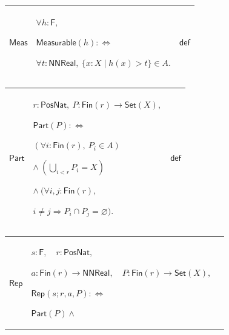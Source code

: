 \documentclass[11pt]{amsart}
\newlength{\FTCThreeColumnBody}
\begin{document}
{\noindent
\begin{tabular}{|@{}>{\centering\arraybackslash}m{0.251968\FTCThreeColumnBody}|>{\centering\arraybackslash}m{0.590551\FTCThreeColumnBody}|>{\centering\arraybackslash}m{0.157480\FTCThreeColumnBody}|}\hline
\hypertarget{def:Meas}{$\displaystyle \textsf{Meas}$} & $\displaystyle \forall h:\textsf{F},$\par
$\displaystyle \textsf{Measurable}(h):\Longleftrightarrow$\par
$\displaystyle \forall t:\textsf{NNReal},\ \{x:X\mid h(x)>t\}\in A.$ & $\displaystyle \textsf{def}$\\ \hline
\end{tabular}%
\par\setlength{\parskip}{0pt}\nointerlineskip
\noindent
\begin{tabular}{|@{}>{\centering\arraybackslash}m{0.251968\FTCThreeColumnBody}|>{\centering\arraybackslash}m{0.590551\FTCThreeColumnBody}|>{\centering\arraybackslash}m{0.157480\FTCThreeColumnBody}|}\hline
\hypertarget{def:Part}{$\displaystyle \textsf{Part}$} & $\displaystyle r:\textsf{PosNat},\ P:\textsf{Fin}(r)\to\textsf{Set}(X),$\par
$\displaystyle \textsf{Part}(P):\Longleftrightarrow$\par
$\displaystyle (\forall i:\textsf{Fin}(r),\ P_i\in A)$\par
$\displaystyle \land\ (\bigcup_{i<r}P_i=X)$\par
$\displaystyle \land\ (\forall i,j:\textsf{Fin}(r),$\par
$\displaystyle i\ne j\Rightarrow P_i\cap P_j=\varnothing).$ & $\displaystyle \textsf{def}$\\ \hline
\end{tabular}%
\par\setlength{\parskip}{0pt}\nointerlineskip
\noindent
\begin{tabular}{|@{}>{\centering\arraybackslash}m{0.251968\FTCThreeColumnBody}|>{\centering\arraybackslash}m{0.590551\FTCThreeColumnBody}|>{\centering\arraybackslash}m{0.157480\FTCThreeColumnBody}|}\hline
\hypertarget{def:Rep}{$\displaystyle \textsf{Rep}$} & $\displaystyle s:\textsf{F},\quad r:\textsf{PosNat},$\par
$\displaystyle a:\textsf{Fin}(r)\to\textsf{NNReal},\quad P:\textsf{Fin}(r)\to\textsf{Set}(X),$\par
$\displaystyle \textsf{Rep}(s;r,a,P):\Longleftrightarrow$\par
$\displaystyle \textsf{Part}(P)\land$\par

\end{tabular}}
\end{document}
